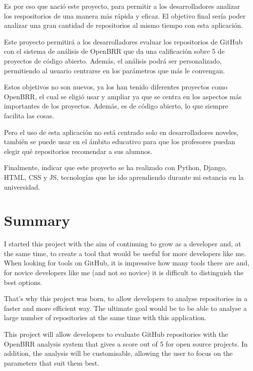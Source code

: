 \documentclass[a4paper, 12pt]{book}
\begin{document}
Es por eso que nació este proyecto, para permitir a los desarrolladores analizar los respositorios de una manera más rápida y eficaz. El objetivo final sería poder analizar una gran cantidad de repositorios al mismo tiempo con esta aplicación.

Este proyecto permitirá a los desarrolladores evaluar los repositorios de GitHub con el sistema de análisis de OpenBRR que da una calificación sobre 5 de proyectos de código abierto. Además, el análisis podrá ser personalizado, permitiendo al usuario centrarse en los parámetros que más le convengan.

Estos objetivos no son nuevos, ya los han tenido diferentes proyectos como OpenBRR, el cual se eligió usar y ampliar ya que se centra en los aspectos más importantes de los proyectos. Además, es de código abierto, lo que siempre facilita las cosas.

Pero el uso de esta aplicación no está centrado solo en desarrolladores noveles, también se puede usar en el ámbito educativo para que los profesores puedan elegir qué repositorios recomendar a sus alumnos. 

Finalmente, indicar que este proyecto se ha realizado con Python, Django, HTML, CSS  y JS, tecnologías que he ido aprendiendo durante mi estancia en la universidad.


\chapter*{Summary}

I started this project with the aim of continuing to grow as a developer and, at the same time, to create a tool that would be useful for more developers like me. When looking for tools on GitHub, it is impressive how many tools there are and, for novice developers like me (and not so novice) it is difficult to distinguish the best options.

That's why this project was born, to allow developers to analyse repositories in a faster and more efficient way. The ultimate goal would be to be able to analyse a large number of repositories at the same time with this application.

This project will allow developers to evaluate GitHub repositories with the OpenBRR analysis system that gives a score out of 5 for open source projects. In addition, the analysis will be customisable, allowing the user to focus on the parameters that suit them best.
\end{document}
